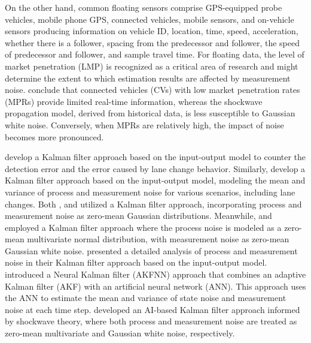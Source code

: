 On the other hand, common floating sensors comprise GPS-equipped probe vehicles, mobile phone GPS, connected vehicles, mobile sensors, and on-vehicle sensors producing information on vehicle ID, location, time, speed, acceleration, whether there is a follower, spacing from the predecessor and follower, the speed of predecessor and follower, and sample travel time. For floating data, the level of market penetration (LMP) is recognized as a critical area of research and might determine the extent to which estimation results are affected by measurement noise. \textcite{hu2022high} conclude that connected vehicles (CVs) with low market penetration rates (MPRs) provide limited real-time information, whereas the shockwave propagation model, derived from historical data, is less susceptible to Gaussian white noise. Conversely, when MPRs are relatively high, the impact of noise becomes more pronounced.

\textcite{lee2015real} develop a Kalman filter approach based on the input-output model to counter the detection error and the error caused by lane change behavior. Similarly, \textcite{anusha2022dynamical} develop a Kalman filter approach based on the input-output model, modeling the mean and variance of process and measurement noise for various scenarios, including lane changes. Both \textcite{yin2018kalman}, and \textcite{vigos2008real} utilized a Kalman filter approach, incorporating process and measurement noise as zero-mean Gaussian distributions. Meanwhile, \textcite{abewickrema2023multivariate} and \textcite{wang2021kalman} employed a Kalman filter approach where the process noise is modeled as a zero-mean multivariate normal distribution, with measurement noise as zero-mean Gaussian white noise.  \textcite{vigos2010simplified} presented a detailed analysis of process and measurement noise in their Kalman filter approach based on the input-output model. \textcite{aljamal2020real} introduced a Neural Kalman filter (AKFNN) approach that combines an adaptive Kalman filter (AKF) with an artificial neural network (ANN). This approach uses the ANN to estimate the mean and variance of state noise and measurement noise at each time step. \textcite{ferencz2023road} developed an AI-based Kalman filter approach informed by shockwave theory, where both process and measurement noise are treated as zero-mean multivariate and Gaussian white noise, respectively.

